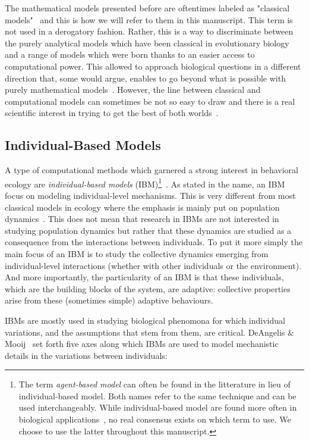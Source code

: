     The mathematical models presented before are oftentimes labeled as "classical models"~\parencite{DeAngelis2005, Adami2014} and this is how we will refer to them in this manuscript. This term is not used in a derogatory fashion. Rather, this is a way to discriminate between the purely analytical models which have been classical in evolutionary biology and a range of models which were born thanks to an easier access to computational power. This allowed to approach biological questions in a different direction that, some would argue, enables to go beyond what is possible with purely mathematical models~\parencite{Adami2012}. However, the line between classical and computational models can sometimes be not so easy to draw and there is a real scientific interest in trying to get the best of both worlds~\parencite{Wilson1998}.

    \subsection{Individual-Based Models} 

        A type of computational methods which garnered a strong interest in behavioral ecology are \emph{individual-based models} (IBM)\footnote{The term \emph{agent-based model} can often be found in the litterature in lieu of individual-based model. Both names refer to the same technique and can be used interchangeably. While individual-based model are found more often in biological applications~\parencite{Grimm2005}, no real consensus exists on which term to use. We choose to use the latter throughout this manuscript.}~\parencite{Huston1988}. As stated in the name, an IBM focus on modeling individual-level mechanisms. This is very different from most classical models in ecology where the emphasis is mainly put on population dynamics~\parencite{Grimm2005}. This does not mean that research in IBMs are not interested in studying population dynamics but rather that these dynamics are studied as a consequence from the interactions between individuals. To put it more simply the main focus of an IBM is to study the collective dynamics emerging from individual-level interactions (whether with other individuals or the environment). And more importantly, the particularity of an IBM is that these individuals, which are the building blocks of the system, are adaptive: collective properties arise from these (sometimes simple) adaptive behaviours.

        IBMs are mostly used in studying biological phenomona for which individual variations, and the assumptions that stem from them, are critical. DeAngelis \& Mooij~\parencite{DeAngelis2005} set forth five axes along which IBMs are used to model mechanistic details in the variations between individuals:

